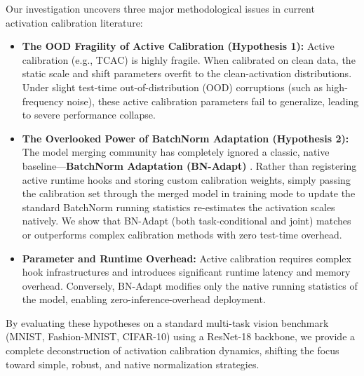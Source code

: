 \documentclass{article}
\begin{document}
Our investigation uncovers three major methodological issues in current activation calibration literature:
\begin{itemize}
    \item \textbf{The OOD Fragility of Active Calibration (Hypothesis 1):} Active calibration (e.g., TCAC) is highly fragile. When calibrated on clean data, the static scale and shift parameters overfit to the clean-activation distributions. Under slight test-time out-of-distribution (OOD) corruptions (such as high-frequency noise), these active calibration parameters fail to generalize, leading to severe performance collapse.
    \item \textbf{The Overlooked Power of BatchNorm Adaptation (Hypothesis 2):} The model merging community has completely ignored a classic, native baseline—\textbf{BatchNorm Adaptation (BN-Adapt)} \cite{jordan2022repair}. Rather than registering active runtime hooks and storing custom calibration weights, simply passing the calibration set through the merged model in training mode to update the standard BatchNorm running statistics re-estimates the activation scales natively. We show that BN-Adapt (both task-conditional and joint) matches or outperforms complex calibration methods with zero test-time overhead.
    \item \textbf{Parameter and Runtime Overhead:} Active calibration requires complex hook infrastructures and introduces significant runtime latency and memory overhead. Conversely, BN-Adapt modifies only the native running statistics of the model, enabling zero-inference-overhead deployment.
\end{itemize}

By evaluating these hypotheses on a standard multi-task vision benchmark (MNIST, Fashion-MNIST, CIFAR-10) using a ResNet-18 backbone, we provide a complete deconstruction of activation calibration dynamics, shifting the focus toward simple, robust, and native normalization strategies.
\end{document}
